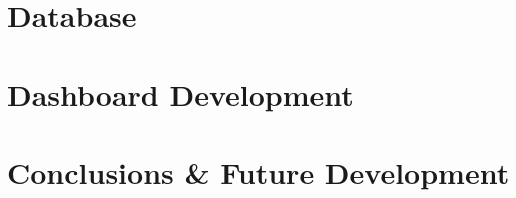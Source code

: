\documentclass[a4paper,12pt,twoside]{report}
\begin{document}
% 	

\chapter{Database}



\chapter{Dashboard Development}



\chapter{Conclusions \& Future Development}



\cleardoublepage




\listoffigures
\end{document}
